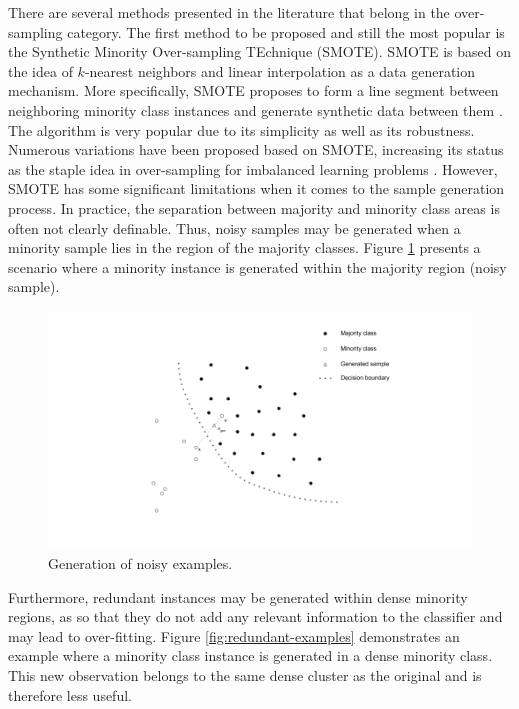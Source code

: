 \documentclass[parskip=full]{scrartcl}
\begin{document}
There are several methods presented in the literature that belong in the
over-sampling category. The first method to be  proposed and still the most
popular is the Synthetic Minority Over-sampling TEchnique (SMOTE). SMOTE is based
on the idea of \( k \)-nearest neighbors and linear interpolation as a data
generation mechanism. More specifically, SMOTE proposes to form a line segment
between neighboring minority class instances and generate synthetic data between
them \cite{Chawla.2002}. The algorithm is very popular due to its simplicity as
well as its robustness. Numerous variations have been proposed based on SMOTE,
increasing its status as the staple idea in over-sampling for imbalanced
learning problems \cite{Fernandez.2018}. However, SMOTE has some significant
limitations when it comes to the sample generation process. In practice, the
separation between majority and minority class areas is often not clearly
definable. Thus, noisy samples may be generated when a minority sample lies in
the region of the majority classes. Figure \ref{fig:noisy-examples} presents a
scenario where a minority instance is generated within the majority region
(noisy sample).

\begin{figure}[H]
	\centering
	\includegraphics[width=1.0\linewidth]{../analysis/noisy_examples.png}
	\caption{Generation of noisy examples.}
	\label{fig:noisy-examples}
\end{figure}

Furthermore, redundant instances may be generated within dense minority regions,
as so that they do not add any relevant information to the classifier and may
lead to over-fitting. Figure \ref{fig:redundant-examples} demonstrates an
example where a minority  class instance is generated in a dense minority class.
This new observation belongs to the same dense cluster as the original and is
therefore less useful. 
\end{document}
